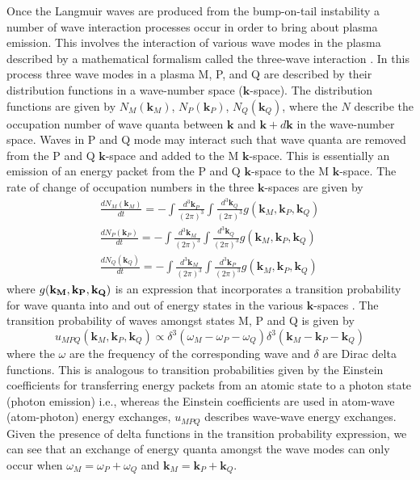 Once the Langmuir waves are produced from the bump-on-tail instability a number of wave interaction processes occur in order to bring about plasma emission. This involves the interaction of various wave modes in the plasma described by a mathematical formalism called the three-wave interaction \citep{robinson1993, robinson1994}. In this process three wave modes in a plasma M, P, and Q are described by their distribution functions in a wave-number space ($\mathbf{k}$-space). The distribution functions are given by $N_M(\mathbf{k}_M)$, $N_P(\mathbf{k}_P)$, $N_Q(\mathbf{k}_Q)$, where the $N$ describe the occupation number of wave quanta between $\mathbf{k}$ and $\mathbf{k}+d\mathbf{k}$ in the wave-number space. Waves in P and Q mode may interact such that wave quanta are removed from the P and Q $\mathbf{k}$-space and added to the M $\mathbf{k}$-space. This is essentially an emission of an energy packet from the P and Q $\mathbf{k}$-space to the M $\mathbf{k}$-space. The rate of change of occupation numbers in the three $\mathbf{k}$-spaces are given by
\begin{eqnarray}
\frac{dN_M(\mathbf{k}_M)}{dt} = -\int \frac{d^3\mathbf{k}_P}{(2\pi)^3}\int \frac{d^3\mathbf{k}_Q}{(2\pi)^3}g(\mathbf{k}_M, \mathbf{k}_P, \mathbf{k}_Q) \\
%
\frac{dN_P(\mathbf{k}_P)}{dt} = -\int \frac{d^3\mathbf{k}_M}{(2\pi)^3}\int \frac{d^3\mathbf{k}_Q}{(2\pi)^3}g(\mathbf{k}_M, \mathbf{k}_P, \mathbf{k}_Q) \\
%
\frac{dN_Q(\mathbf{k}_Q)}{dt} = -\int \frac{d^3\mathbf{k}_M}{(2\pi)^3}\int \frac{d^3\mathbf{k}_P}{(2\pi)^3}g(\mathbf{k}_M, \mathbf{k}_P, \mathbf{k}_Q)
\end{eqnarray}
where $g(\bf{k}_M, \bf{k}_P, \bf{k}_Q)$ is an expression that incorporates a transition probability for wave quanta into and out of energy states in the various $\mathbf{k}$-spaces \citep{robinson1994}. The transition probability of waves amongst states M, P and Q is given by \citep{melrose1986}
\begin{equation}
u_{MPQ}(\mathbf{k}_M, \mathbf{k}_P, \mathbf{k}_Q)  \propto \delta^3(\omega_M - \omega_P - \omega_Q ) \delta^3(\mathbf{k}_M - \mathbf{k}_P - \mathbf{k}_Q )
\end{equation}
where the $\omega$ are the frequency of the corresponding wave and $\delta$ are Dirac delta functions. This is analogous to transition probabilities given by the Einstein coefficients for transferring energy packets from an atomic state to a photon state (photon emission) i.e., whereas the Einstein coefficients are used in atom-wave (atom-photon) energy exchanges, $u_{MPQ}$ describes wave-wave energy exchanges. Given the presence of delta functions in the transition probability expression, we can see that an exchange of energy quanta amongst the wave modes can only occur when $\omega_M =  \omega_P +\omega_Q$ and $\mathbf{k}_M  =  \mathbf{k}_P + \mathbf{k}_Q$.
